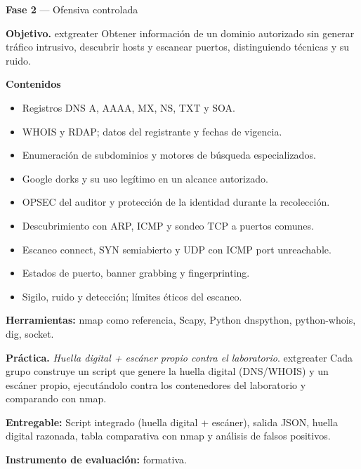 \documentclass[11pt,a4paper]{article}
\begin{document}
\begin{tcolorbox}[cajaContenido,title={Semana 4 --- Reconocimiento, OSINT y escaneo de puertos}]
\textbf{Fase 2} --- Ofensiva controlada

\textbf{Objetivo.} 	extgreater{} Obtener información de un dominio autorizado sin generar tráfico intrusivo, descubrir hosts y escanear puertos, distinguiendo técnicas y su ruido.

\textbf{Contenidos}

\begin{itemize}[leftmargin=1.4em,itemsep=2pt,topsep=3pt]
  \item Registros DNS A, AAAA, MX, NS, TXT y SOA.
  \item WHOIS y RDAP; datos del registrante y fechas de vigencia.
  \item Enumeración de subdominios y motores de búsqueda especializados.
  \item Google dorks y su uso legítimo en un alcance autorizado.
  \item OPSEC del auditor y protección de la identidad durante la recolección.
  \item Descubrimiento con ARP, ICMP y sondeo TCP a puertos comunes.
  \item Escaneo connect, SYN semiabierto y UDP con ICMP port unreachable.
  \item Estados de puerto, banner grabbing y fingerprinting.
  \item Sigilo, ruido y detección; límites éticos del escaneo.
\end{itemize}

\textbf{Herramientas:} nmap como referencia, Scapy, Python dnspython, python-whois, dig, socket.

\textbf{Práctica.} \emph{Huella digital + escáner propio contra el laboratorio}. 	extgreater{} Cada grupo construye un script que genere la huella digital (DNS/WHOIS) y un escáner propio, ejecutándolo contra los contenedores del laboratorio y comparando con nmap.

\textbf{Entregable:} Script integrado (huella digital + escáner), salida JSON, huella digital razonada, tabla comparativa con nmap y análisis de falsos positivos.

\textbf{Instrumento de evaluación:} formativa.
\end{tcolorbox}
\end{document}
